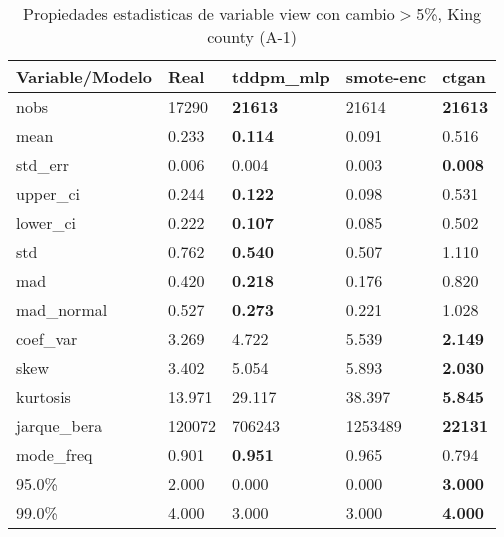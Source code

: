 \begin{table}[H]
\centering
\fontsize{8}{14}\selectfont
\caption{Propiedades estadisticas de variable view con cambio\ensuremath{>}5\%, King county (A-1)}
\label{table-stats-king county-a-1-view-short}
\begin{tabular}{|l|m{10em}|m{10em}|m{10em}|m{10em}|}
\hline
 \rowcolor[gray]{0.8}
Variable/Modelo & Real & tddpm\_mlp & smote-enc & ctgan \\
\hline nobs & 17290 & \bfseries 21613 & \cellcolor[rgb]{0.9, 0.54, 0.52} 21614 & \bfseries 21613 \\
\hline mean & 0.233 & \bfseries 0.114 & 0.091 & \cellcolor[rgb]{0.9, 0.54, 0.52} 0.516 \\
\hline std\_err & 0.006 & 0.004 & \cellcolor[rgb]{0.9, 0.54, 0.52} 0.003 & \bfseries 0.008 \\
\hline upper\_ci & 0.244 & \bfseries 0.122 & 0.098 & \cellcolor[rgb]{0.9, 0.54, 0.52} 0.531 \\
\hline lower\_ci & 0.222 & \bfseries 0.107 & 0.085 & \cellcolor[rgb]{0.9, 0.54, 0.52} 0.502 \\
\hline std & 0.762 & \bfseries 0.540 & 0.507 & \cellcolor[rgb]{0.9, 0.54, 0.52} 1.110 \\
\hline mad & 0.420 & \bfseries 0.218 & 0.176 & \cellcolor[rgb]{0.9, 0.54, 0.52} 0.820 \\
\hline mad\_normal & 0.527 & \bfseries 0.273 & 0.221 & \cellcolor[rgb]{0.9, 0.54, 0.52} 1.028 \\
\hline coef\_var & 3.269 & 4.722 & \cellcolor[rgb]{0.9, 0.54, 0.52} 5.539 & \bfseries 2.149 \\
\hline skew & 3.402 & 5.054 & \cellcolor[rgb]{0.9, 0.54, 0.52} 5.893 & \bfseries 2.030 \\
\hline kurtosis & 13.971 & 29.117 & \cellcolor[rgb]{0.9, 0.54, 0.52} 38.397 & \bfseries 5.845 \\
\hline jarque\_bera & 120072 & 706243 & \cellcolor[rgb]{0.9, 0.54, 0.52} 1253489 & \bfseries 22131 \\
\hline mode\_freq & 0.901 & \bfseries 0.951 & 0.965 & \cellcolor[rgb]{0.9, 0.54, 0.52} 0.794 \\
\hline 95.0\% & 2.000 & \cellcolor[rgb]{0.9, 0.54, 0.52} 0.000 & \cellcolor[rgb]{0.9, 0.54, 0.52} 0.000 & \bfseries 3.000 \\
\hline 99.0\% & 4.000 & \cellcolor[rgb]{0.9, 0.54, 0.52} 3.000 & \cellcolor[rgb]{0.9, 0.54, 0.52} 3.000 & \bfseries 4.000 \\
\hline
\end{tabular}
\end{table}
